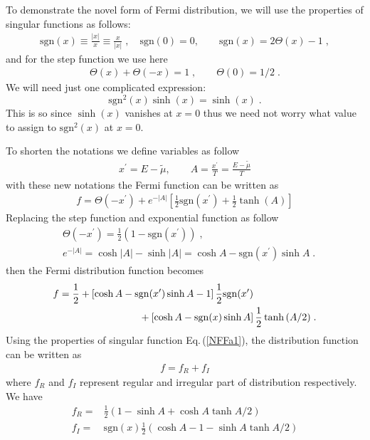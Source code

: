 \documentclass[sn-mathphys,Numbered]{sn-jnl}
\theoremstyle{thmstyleone}%
\theoremstyle{thmstyletwo}%
\theoremstyle{thmstylethree}%
\begin{document}
To demonstrate the novel form of Fermi distribution, we will use the properties of singular functions as follows: 
\begin{align}\label{NFF2a}
\mathrm{sgn}(x)%
\equiv  \frac{|x|}{x}\equiv \frac{x}{|x|}\;,
   \quad \mathrm{sgn}(0)=0,\qquad
 \mathrm{sgn}(x)=2\Theta(x)-1\;,
 \end{align}
 and for the step function we use here
 \begin{align}
\label{NFF2c}
 \Theta(x)+\Theta(-x)=1\;,\qquad\label{NFF3}
 \Theta(0)=1/2\;.
 \end{align}
We will need just one complicated expression:
\begin{equation}\label{NFFa1}
\mathrm{sgn}^{2}(x)\sinh(x)=\sinh(x)\;.
 \end{equation}
This is so since $\sinh(x)$  vanishes  at $x=0$ thus we need not worry what value to assign to $\mathrm{sgn}^{2}(x)$ at $x=0$.  

To shorten the notations we define variables as follow
\begin{align}
x^\prime=E-\tilde\mu,\qquad A = \frac{x^\prime}{T}= \frac{E-\tilde\mu}{T}
\end{align}
with these new notations the Fermi function can be written as
\begin{align}
f=\Theta(-x^\prime)+e^{-|A|}\left[\frac{1}{2}\mathrm{sgn}\left(x^\prime\right) 
 +\frac{1}{2}\tanh\left(A\right)\right]
\end{align}
Replacing the step function and exponential function as  follow
 \begin{align}\label{NFF4}
&\Theta(-x^\prime)=\frac 1 2 (1-\mathrm{sgn}(x^\prime))\;,\\ 
&e^{-|A|}=\cosh|A|-\sinh|A|=\cosh A- \mathrm{sgn}(x^\prime)\sinh A\;.
\end{align}
then the Fermi distribution function becomes
\begin{align}
f=\frac{1}{2} &+\left[\cosh {A}- \mathrm{sgn}(x^\prime)\sinh{A} -1\right]\frac{1}{2} \mathrm{sgn}(x^\prime)\notag\\
 &\qquad\qquad\qquad+\left[\cosh{A}- \mathrm{sgn}(x)\sinh{A} \right]\frac{1}{2}\tanh{(A/2)}\;.
\end{align}
Using the properties of singular function  Eq.\,(\ref{NFFa1}), the distribution function can be written as
\begin{align}
f=f_R+f_I
\end{align}
where $f_R$ and $f_I$ represent regular and irregular part of distribution respectively. We have
\begin{align}\label{NFF5a}
 f_R=& \frac{1}{2}\left(1-\sinh A +\cosh A \tanh A/2\right) \\
 f_I=& \mathrm{sgn}(x) \frac{1}{2} \left(\cosh A-1 - \sinh A \tanh A/2\right)
 \label{NFF5b}
\end{align}
\end{document}
